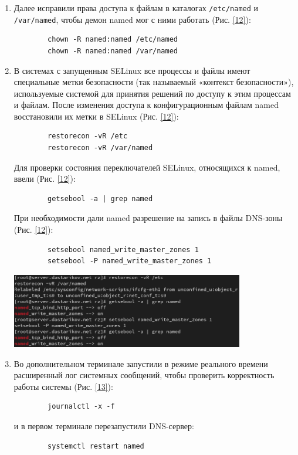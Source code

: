 \begin{enumerate}
    \item Далее исправили права доступа к файлам в каталогах {\tt /etc/named} и {\tt /var/named}, чтобы демон named мог с ними работать (Рис. \ref{12}):
        \begin{verbatim}
        chown -R named:named /etc/named
        chown -R named:named /var/named
        \end{verbatim}
    \item В системах с запущенным SELinux все процессы и файлы имеют специальные метки безопасности (так называемый «контекст безопасности»), используемые системой для принятия решений по доступу к этим процессам и файлам. После изменения доступа к конфигурационным файлам named восстановили их метки в SELinux (Рис. \ref{12}):
        \begin{verbatim}
        restorecon -vR /etc
        restorecon -vR /var/named
        \end{verbatim}
    Для проверки состояния переключателей SELinux, относящихся к named, ввели (Рис. \ref{12}):
        \begin{verbatim}
        getsebool -a | grep named
        \end{verbatim}
    При необходимости дали named разрешение на запись в файлы DNS-зоны (Рис. \ref{12}):
        \begin{verbatim}
        setsebool named_write_master_zones 1
        setsebool -P named_write_master_zones 1
        \end{verbatim}

\begin{center}
    \centering
    \includegraphics[width=0.8\textwidth]{../images/image12.png}
    \label{12}
\end{center}

    \item Во дополнительном терминале запустили в режиме реального времени расширенный лог системных сообщений, чтобы проверить корректность работы системы (Рис. \ref{13}):
        \begin{verbatim}
        journalctl -x -f
        \end{verbatim}
    и в первом терминале перезапустили DNS-сервер:
        \begin{verbatim}
        systemctl restart named
        \end{verbatim}


\end{enumerate}
